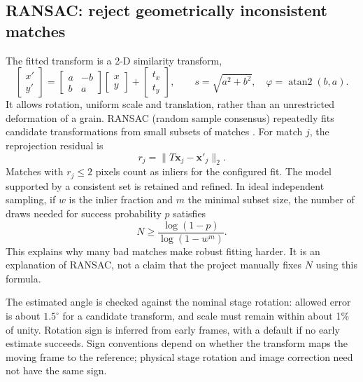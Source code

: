 \subsection{RANSAC: reject geometrically inconsistent matches}
The fitted transform is a 2-D similarity transform,
\begin{equation}\label{eq:similarity}
\begin{bmatrix}x'\\y'\end{bmatrix}
=\begin{bmatrix}a&-b\\b&a\end{bmatrix}
\begin{bmatrix}x\\y\end{bmatrix}
+\begin{bmatrix}t_x\\t_y\end{bmatrix},\qquad
s=\sqrt{a^2+b^2},\quad\varphi=\operatorname{atan2}(b,a).
\end{equation}
It allows rotation, uniform scale and translation, rather than an unrestricted deformation of a grain. RANSAC (random sample consensus) repeatedly fits candidate transformations from small subsets of matches \cite{ransac}. For match $j$, the reprojection residual is
\begin{equation}
r_j=\|T\mathbf x_j-\mathbf x'_j\|_2.
\end{equation}
Matches with $r_j\leq2$ pixels count as inliers for the configured fit. The model supported by a consistent set is retained and refined. In ideal independent sampling, if $w$ is the inlier fraction and $m$ the minimal subset size, the number of draws needed for success probability $p$ satisfies
\begin{equation}
N\geq\frac{\log(1-p)}{\log(1-w^m)}.
\end{equation}
This explains why many bad matches make robust fitting harder. It is an explanation of RANSAC, not a claim that the project manually fixes $N$ using this formula.

The estimated angle is checked against the nominal stage rotation: allowed error is about $1.5^\circ$ for a candidate transform, and scale must remain within about 1\% of unity. Rotation sign is inferred from early frames, with a default if no early estimate succeeds. Sign conventions depend on whether the transform maps the moving frame to the reference; physical stage rotation and image correction need not have the same sign.

